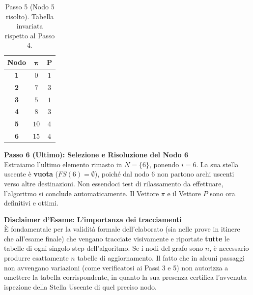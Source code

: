 \documentclass[12pt, a4paper]{article}
\begin{document}
	\begin{table}[H]
		\centering
		\begin{tabular}{|c|c|c|}
			\hline
			\textbf{Nodo} & $\boldsymbol{\pi}$ & $\mathbf{P}$ \\
			\hline
			\rowcolor{titlecolor!20} \textbf{1} & $0$ & $1$ \\
			\rowcolor{titlecolor!20} \textbf{2} & $7$ & $3$ \\
			\rowcolor{titlecolor!20} \textbf{3} & $5$ & $1$ \\
			\rowcolor{titlecolor!20} \textbf{4} & $8$ & $3$ \\
			\rowcolor{titlecolor!20} \textbf{5} & $10$ & $4$ \\
			\textbf{6} & $15$ & $4$ \\
			\hline
		\end{tabular}
		\caption*{Passo 5 (Nodo 5 risolto). Tabella invariata rispetto al Passo 4.}
	\end{table}
	
	\textbf{Passo 6 (Ultimo): Selezione e Risoluzione del Nodo 6}\\
	Estraiamo l'ultimo elemento rimasto in $N = \{6\}$, ponendo $i = 6$. 
	La sua stella uscente è \textbf{vuota} ($FS(6) = \emptyset$), poiché dal nodo 6 non partono archi uscenti verso altre destinazioni. Non essendoci test di rilassamento da effettuare, l'algoritmo si conclude automaticamente. Il Vettore $\pi$ e il Vettore $P$ sono ora definitivi e ottimi.
	
	\vspace{0.4cm}
	\begin{minipage}{\textwidth}
		\textbf{Disclaimer d'Esame: L'importanza dei tracciamenti}\\
		È fondamentale per la validità formale dell'elaborato (sia nelle prove in itinere che all'esame finale) che vengano tracciate visivamente e riportate \textbf{tutte} le tabelle di ogni singolo step dell'algoritmo. Se i nodi del grafo sono $n$, è necessario produrre esattamente $n$ tabelle di aggiornamento. Il fatto che in alcuni passaggi non avvengano variazioni (come verificatosi ai Passi 3 e 5) non autorizza a omettere la tabella corrispondente, in quanto la sua presenza certifica l'avvenuta ispezione della Stella Uscente di quel preciso nodo.
	\end{minipage}
	\vspace{0.4cm}
	
\end{document}
